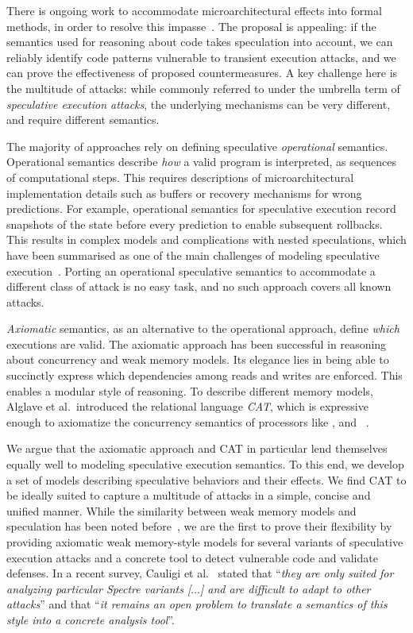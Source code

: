 \documentclass[conference]{IEEEtran}
\begin{document}
There is ongoing work to accommodate microarchitectural effects into formal methods, in order to resolve this impasse~\cite{CauligiDGTSRB20,DanielBR20,GuancialeBD20,GuarnieriKMRS20,spectaint,WangCBMR20,oo7,Wu019}. The proposal is appealing: if the semantics used for reasoning about code takes speculation into account, we can reliably identify code patterns vulnerable to transient execution attacks, and we can prove the effectiveness of proposed countermeasures. 
A key challenge here is the multitude of attacks: while commonly referred to under the umbrella term of \emph{speculative execution attacks}, the underlying mechanisms can be very different, and require different semantics.


The majority of approaches rely on defining speculative \emph{operational} semantics.
Operational semantics describe \emph{how} a valid program is interpreted, as sequences of computational steps.
%
This requires descriptions of microarchitectural implementation details such as buffers or recovery mechanisms for wrong predictions. 
For example, operational semantics for speculative execution record snapshots of the state before every prediction to enable subsequent rollbacks.
% 
This results in complex models and complications with nested speculations, which have been summarised as one of the main challenges of modeling speculative execution~\cite{GuarnieriKMRS20,OleksenkoTSF20}.
%
Porting an operational speculative semantics to accommodate a different class of attack is no easy task, and no such approach covers all known attacks. 

\emph{Axiomatic} semantics, as an alternative to the operational approach, define \emph{which} executions are valid. The axiomatic approach has been successful in reasoning about concurrency and weak memory models. Its elegance lies in being able to succinctly express which dependencies among reads and writes are enforced. 
This enables a modular style of reasoning.
To describe different memory models, Alglave et al.~introduced the relational language \emph{CAT}, which is expressive enough to axiomatize the concurrency semantics of processors like \xes, \power and \arm~\cite{cat,AlglaveDGHM21,AlglaveMT14}.

We argue that the axiomatic approach and CAT in particular lend themselves equally well to modeling speculative execution semantics. To this end, we develop a set of models describing speculative behaviors and their effects. 
We find CAT to be ideally suited to capture a multitude of attacks in a simple, concise and unified manner. 
%
While the similarity between weak memory models and speculation has been noted before~\cite{ColvinW19,DisselkoenJJR19,checkmate}, we are the first to prove their flexibility by providing axiomatic weak memory-style models for several variants of speculative execution attacks and a concrete tool to detect vulnerable code and validate defenses. In a recent survey, Cauligi et al.~\cite{sok:spectre} stated that \enquote{\emph{they are only suited for analyzing particular Spectre variants [$\ldots$] and are difficult to adapt to other attacks}} and that \enquote{\emph{it remains an open problem to translate a semantics of this style into a concrete analysis tool}}.
%
\end{document}
